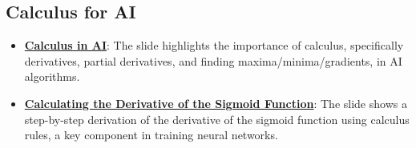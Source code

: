 \documentclass{article}%
\begin{document}
%
\subsection{Calculus for AI}%
\label{subsec:CalculusforAI}%
\begin{itemize}[leftmargin=*]%
\item \href{https://purdue.brightspace.com/d2l/common/assets/pdfjs-d2l-dist/1.0.14-legacy/web/viewer.html?file=\%2Fcontent\%2Fenforced\%2F1095467-wl.202510.CS.24300.001\%2F04L1-Linear Algebra Primer.pdf\%3Fou\%3D1095467\&lang=en-us\&container=d2l-fileviewer-rendered-pdf\&fullscreen=d2l-fileviewer-rendered-pdf-dialog\&height=667#page=19}{\textbf{Calculus in AI}}: The slide highlights the importance of calculus, specifically derivatives, partial derivatives, and finding maxima/minima/gradients, in AI algorithms.%
\item \href{https://purdue.brightspace.com/d2l/common/assets/pdfjs-d2l-dist/1.0.14-legacy/web/viewer.html?file=\%2Fcontent\%2Fenforced\%2F1095467-wl.202510.CS.24300.001\%2F04L1-Linear Algebra Primer.pdf\%3Fou\%3D1095467\&lang=en-us\&container=d2l-fileviewer-rendered-pdf\&fullscreen=d2l-fileviewer-rendered-pdf-dialog\&height=667#page=21}{\textbf{Calculating the Derivative of the Sigmoid Function}}: The slide shows a step-by-step derivation of the derivative of the sigmoid function using calculus rules, a key component in training neural networks.%
\end{itemize}

%
\end{document}
